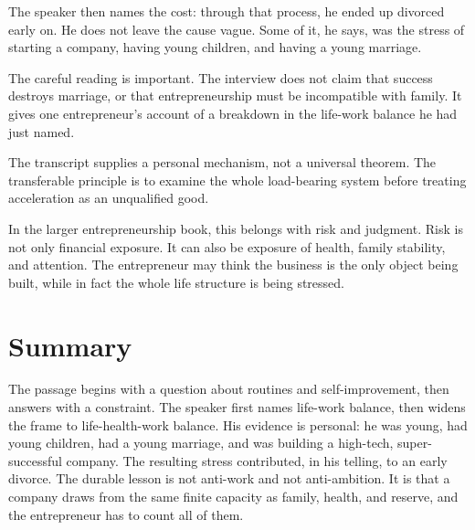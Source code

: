 The speaker then names the cost: through that process, he ended up divorced early on. He does not leave the cause vague. Some of it, he says, was the stress of starting a company, having young children, and having a young marriage.

The careful reading is important. The interview does not claim that success destroys marriage, or that entrepreneurship must be incompatible with family. It gives one entrepreneur's account of a breakdown in the life-work balance he had just named.

\begin{remark}
The transcript supplies a personal mechanism, not a universal theorem. The transferable principle is to examine the whole load-bearing system before treating acceleration as an unqualified good.
\end{remark}

In the larger entrepreneurship book, this belongs with risk and judgment. Risk is not only financial exposure. It can also be exposure of health, family stability, and attention. The entrepreneur may think the business is the only object being built, while in fact the whole life structure is being stressed.

\section{Summary}

The passage begins with a question about routines and self-improvement, then answers with a constraint. The speaker first names life-work balance, then widens the frame to life-health-work balance. His evidence is personal: he was young, had young children, had a young marriage, and was building a high-tech, super-successful company. The resulting stress contributed, in his telling, to an early divorce. The durable lesson is not anti-work and not anti-ambition. It is that a company draws from the same finite capacity as family, health, and reserve, and the entrepreneur has to count all of them.